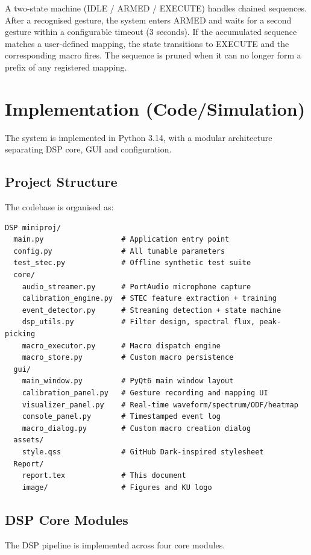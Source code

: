 \documentclass[12pt,a4paper]{article}
\begin{document}
A two-state machine (IDLE / ARMED / EXECUTE) handles chained sequences. After a recognised gesture, the system enters ARMED and waits for a second gesture within a configurable timeout (3 seconds). If the accumulated sequence matches a user-defined mapping, the state transitions to EXECUTE and the corresponding macro fires. The sequence is pruned when it can no longer form a prefix of any registered mapping.

\section{Implementation (Code/Simulation)}

The system is implemented in Python 3.14, with a modular architecture separating DSP core, GUI and configuration.

\subsection{Project Structure}

The codebase is organised as:

\begin{lstlisting}
DSP miniproj/
  main.py                  # Application entry point
  config.py                # All tunable parameters
  test_stec.py             # Offline synthetic test suite
  core/
    audio_streamer.py      # PortAudio microphone capture
    calibration_engine.py  # STEC feature extraction + training
    event_detector.py      # Streaming detection + state machine
    dsp_utils.py           # Filter design, spectral flux, peak-picking
    macro_executor.py      # Macro dispatch engine
    macro_store.py         # Custom macro persistence
  gui/
    main_window.py         # PyQt6 main window layout
    calibration_panel.py   # Gesture recording and mapping UI
    visualizer_panel.py    # Real-time waveform/spectrum/ODF/heatmap
    console_panel.py       # Timestamped event log
    macro_dialog.py        # Custom macro creation dialog
  assets/
    style.qss              # GitHub Dark-inspired stylesheet
  Report/
    report.tex             # This document
    image/                 # Figures and KU logo
\end{lstlisting}

\subsection{DSP Core Modules}

The DSP pipeline is implemented across four core modules.
\end{document}
